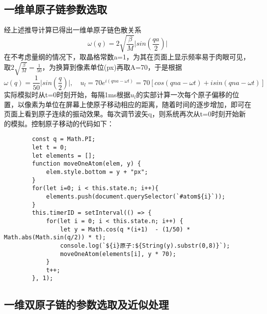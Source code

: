 \documentclass[UTF8]{article}
\begin{document}
\subsection{一维单原子链参数选取}
经上述推导计算已得出一维单原子链色散关系$$\omega(q)=2\sqrt{\frac{\beta}{M}}\vert{sin(\frac{qa}{2})}\vert$$在不考虑量纲的情况下，取晶格常数a=1，为其在页面上显示频率易于肉眼可见，取$2\sqrt{\frac{\beta}{M}}=\frac{1}{50}$，为换算到像素单位(px)再取A=70，于是根据$$\omega(q)=\frac{1}{50}\vert{sin(\frac{q}{2})}\vert,\quad u_l=70e^{i(qna-\omega t)}=70[cos(qna-\omega t)+isin(qna-\omega t)]$$实际模拟时从t=0时刻开始，每隔1ms根据$u_l$的实部计算一次每个原子偏移的位置，以像素为单位在屏幕上使原子移动相应的距离，随着时间的逐步增加，即可在页面上看到原子连续的振动效果。每次调节波矢q，则系统再次从t=0时刻开始新的模拟。控制原子移动的代码如下：
\begin{lstlisting}
        const q = Math.PI;
        let t = 0;
        let elements = [];
        function moveOneAtom(elem, y) {
            elem.style.bottom = y + "px";
        }
        for(let i=0; i < this.state.n; i++){
            elements.push(document.querySelector(`#atom${i}`));
        }
        this.timerID = setInterval(() => {
            for(let i = 0; i < this.state.n; i++) {
                let y = Math.cos(q *(i+1)  - (1/50) * Math.abs(Math.sin(q/2)) * t);
                console.log(`${i}原子:${String(y).substr(0,8)}`);
                moveOneAtom(elements[i], y * 70);
            }
            t++;
        }, 1);
\end{lstlisting}

\subsection{一维双原子链的参数选取及近似处理}
\end{document}
